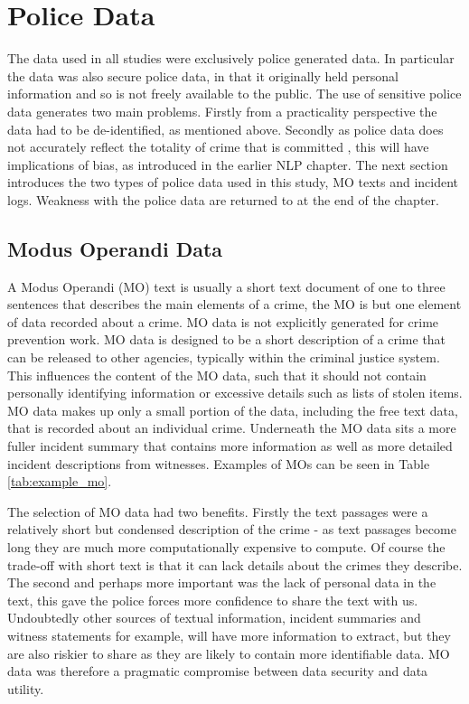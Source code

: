 \section{Police Data} The data used in all studies were exclusively police generated data. In particular the data was also secure police data, in that it originally held personal information and so is not freely available to the public. The use of sensitive police data generates two main problems. Firstly from a practicality perspective the data had to be de-identified, as mentioned above. Secondly as police data does not accurately reflect the totality of crime that is committed \parencite{Tarling}, this will have implications of bias, as introduced in the earlier NLP chapter. The next section introduces the two types of police data used in this study, MO texts and incident logs. Weakness with the police data are returned to at the end of the chapter.


\subsection{Modus Operandi Data} A Modus Operandi (MO) text is usually a short text document of one to three sentences that describes the main elements of a crime, the MO is but one element of data recorded about a crime. MO data is not explicitly generated for crime prevention work. MO data is designed to be a short description of a crime that can be released to other agencies, typically within the criminal justice system. This influences the content of the MO data, such that it should not contain personally identifying information or excessive details such as lists of stolen items. MO data makes up only a small portion of the data, including the free text data, that is recorded about an individual crime. Underneath the MO data sits a more fuller incident summary that contains more information as well as more detailed incident descriptions from witnesses.  Examples of MOs can be seen in Table \ref{tab:example_mo}.

The selection of MO data had two benefits. Firstly the text passages were a relatively short but condensed description of the crime - as text passages become long they are much more computationally expensive to compute. Of course the trade-off with short text is that it can lack details about the crimes they describe.  The second and perhaps more important was the lack of personal data in the text, this gave the police forces more confidence to share the text with us. Undoubtedly other sources of textual information, incident summaries and witness statements for example, will have more information to extract, but they are also riskier to share as they are likely to contain more identifiable data. MO data was therefore a pragmatic compromise between data security and data utility.

